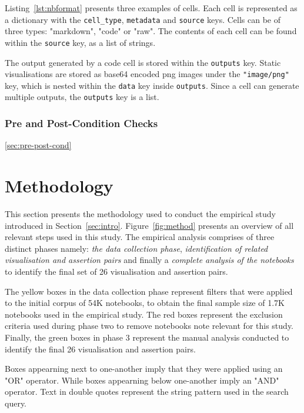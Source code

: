 \documentclass[acmsmall,screen,review,anonymous]{acmart}
\begin{document}
Listing~\ref{lst:nbformat} presents three examples of cells. Each cell is represented as a dictionary with the \texttt{cell\_type}, \texttt{metadata} and \texttt{source} keys. Cells can be of three types: "markdown", "code" or "raw". The contents of each cell can be found within the \texttt{source} key, as a list of strings.

The output generated by a code cell is stored within the \texttt{outputs} key. Static visualisations are stored as base64 encoded png images under the \texttt{"image/png"} key, which is nested within the \texttt{data} key inside \texttt{outputs}. Since a cell can generate multiple outputs, the \texttt{outputs} key is a list.

\subsubsection{Pre and Post-Condition Checks}\ref{sec:pre-post-cond}


\section{Methodology}\label{sec:method}
This section presents the methodology used to conduct the empirical study introduced in Section~\ref{sec:intro}. Figure~\ref{fig:method} presents an overview of all relevant steps used in this study. The empirical analysis comprises of three distinct phases namely: \textit{the data collection phase}, \textit{identification of related visualisation and assertion pairs} and finally a \textit{complete analysis of the notebooks} to identify the final set of 26 visualisation and assertion pairs.

The yellow boxes in the data collection phase represent filters that were applied to the initial corpus of 54K notebooks, to obtain the final sample size of 1.7K notebooks used in the empirical study. The red boxes represent the exclusion criteria used during phase two to remove notebooks note relevant for this study. Finally, the green boxes in phase 3 represent the manual analysis conducted to identify the final 26 visualisation and assertion pairs.

Boxes appearning next to one-another imply that they were applied using an "OR" operator. While boxes appearning below one-another imply an "AND" operator. Text in double quotes represent the string pattern used in the search query.
\end{document}
